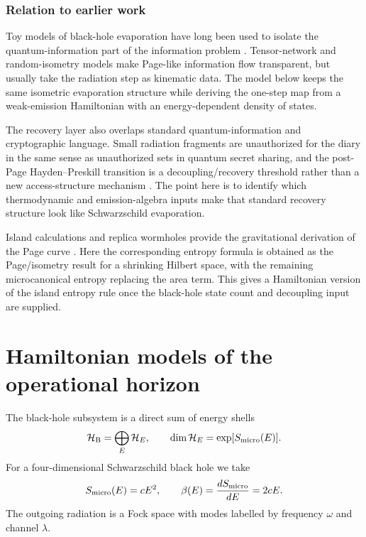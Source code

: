 \documentclass[12pt]{article}
\newcommand{\be}{\begin{equation}}
\newcommand{\ee}{\end{equation}}
\newcommand{\Smicro}{S_{\rm micro}}
\newcommand{\HB}{\mathcal H_{\rm B}}
\begin{document}
\subsubsection*{Relation to earlier work}

Toy models of black-hole evaporation have long been used to isolate the
quantum-information part of the information problem
\cite{Avery2013,OsugaPage2018,PiroliSunderhaufQi2020}.  Tensor-network and
random-isometry models make Page-like information flow transparent, but usually
take the radiation step as kinematic data.  The model below keeps the same
isometric evaporation structure while deriving the one-step map from a
weak-emission Hamiltonian with an energy-dependent density of states.

The recovery layer also overlaps standard quantum-information and
cryptographic language.  Small radiation fragments are unauthorized for the
diary in the same sense as unauthorized sets in quantum secret sharing, and
the post-Page Hayden--Preskill transition is a decoupling/recovery threshold
rather than a new access-structure mechanism
\cite{CleveGottesmanLo1999,TerhalDiVincenzoLeung2001,
DiVincenzoHaydenTerhal2004}.  The point here is to identify which
thermodynamic and emission-algebra inputs make that standard recovery
structure look like Schwarzschild evaporation.

Island calculations and replica wormholes provide the gravitational derivation
of the Page curve \cite{Penington2019,AlmheiriEngelhardtMarolfMaxfield2019,
PeningtonShenkerStanfordYang2022}.  Here the corresponding entropy formula is
obtained as the Page/isometry result for a shrinking Hilbert space, with the
remaining microcanonical entropy replacing the area term.  This gives a
Hamiltonian version of the island entropy rule once the black-hole state count
and decoupling input are supplied.

\section{Hamiltonian models of the operational horizon}

The black-hole subsystem is a direct sum of energy shells
\be
  \HB=\bigoplus_E \mathcal H_E ,
  \qquad
  \dim\mathcal H_E=\exp[\Smicro(E)] .
\ee
For a four-dimensional Schwarzschild black hole we take
\be
  \Smicro(E)=cE^2 ,
  \qquad
  \beta(E)=\frac{d\Smicro}{dE}=2cE .
\ee
The outgoing radiation is a Fock space with modes labelled by frequency
$\omega$ and channel $\lambda$.
\end{document}
